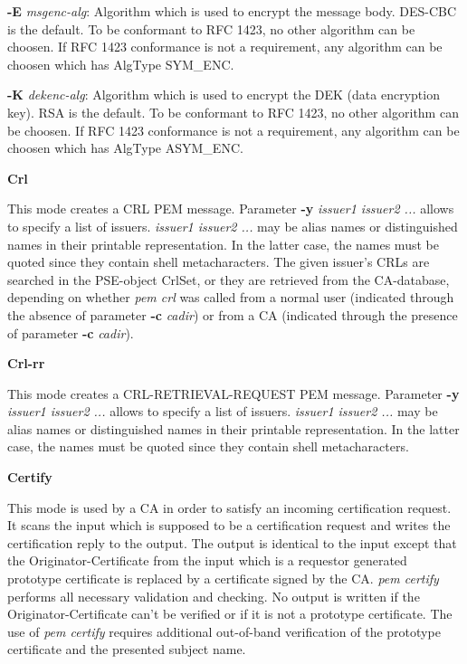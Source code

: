 {\bf -E} {\em msgenc-alg}: Algorithm which is used to encrypt the message body.
DES-CBC is the default.
To be conformant to RFC 1423, no other algorithm can be choosen. If RFC 1423
conformance is not a requirement, any algorithm can be choosen which has AlgType SYM\_ENC.

{\bf -K} {\em dekenc-alg}: Algorithm which is used to encrypt the DEK (data encryption key).
RSA is the default.
To be conformant to RFC 1423, no other algorithm can be choosen. If RFC 1423
conformance is not a requirement, any algorithm can be choosen which has AlgType ASYM\_ENC.

{\large\bf Crl}

This mode creates a CRL PEM message. Parameter {\bf -y} {\em issuer1 issuer2 ...}
allows to specify a list of issuers. {\em issuer1 issuer2 ...} may be alias names or distinguished
names in their printable representation. In the latter case, the names must be quoted since they
contain shell metacharacters. The given issuer's CRLs are searched in the PSE-object CrlSet, or they
are retrieved from the CA-database, depending on whether {\em pem crl} was called from a normal
user (indicated through the absence of parameter {\bf -c} {\em cadir}) or from a CA (indicated through 
the presence of parameter {\bf -c} {\em cadir}).

{\large\bf Crl-rr}

This mode creates a CRL-RETRIEVAL-REQUEST PEM message. Parameter {\bf -y} {\em issuer1 issuer2 
...}
allows to specify a list of issuers. {\em issuer1 issuer2 ...} may be alias names or distinguished
names in their printable representation. In the latter case, the names must be quoted since they
contain shell metacharacters.

{\large\bf Certify}

This mode is used by a CA in order to satisfy an incoming certification request. It scans the input
which is supposed to be a certification request and writes the certification reply to the output.
The output is identical to the input except that the Originator-Certificate from the input which
is a requestor generated prototype certificate is replaced by a certificate signed by the CA.
{\em pem certify} performs all necessary validation and checking. No output is written if the
Originator-Certificate can't be verified or if it is not a prototype certificate. The use
of {\em pem certify} requires additional out-of-band verification of the prototype certificate
and the presented subject name.

